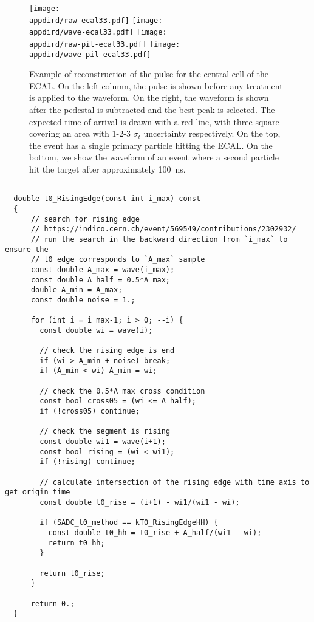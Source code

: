 \begin{figure}[bth!]
  \centering
  \texttt{[image: \\appdird/raw-ecal33.pdf]}
  \texttt{[image: \\appdird/wave-ecal33.pdf]}
  \texttt{[image: \\appdird/raw-pil-ecal33.pdf]}
  \texttt{[image: \\appdird/wave-pil-ecal33.pdf]}    
  \caption[example of pulse reconstruction in NA64]{Example of reconstruction of the pulse for the central cell of the ECAL. On the left column, the pulse is shown before any treatment is applied to the waveform. On the right, the waveform is shown after the pedestal is subtracted and the best peak is selected. The expected time of arrival is drawn with a red line, with three square covering an area with 1-2-3 $\sigma_t$ uncertainty respectively. On the top, the event has a single primary particle hitting the ECAL. On the bottom, we show the waveform of an event where a second particle hit the target after approximately \SI{100}{\nano\second}.}
  \label{fig:pulse-example}
\end{figure}


\begin{lstlisting}

  double t0_RisingEdge(const int i_max) const
  {      
      // search for rising edge
      // https://indico.cern.ch/event/569549/contributions/2302932/
      // run the search in the backward direction from `i_max` to ensure the
      // t0 edge corresponds to `A_max` sample
      const double A_max = wave(i_max);
      const double A_half = 0.5*A_max;
      double A_min = A_max;
      const double noise = 1.;
      
      for (int i = i_max-1; i > 0; --i) {
        const double wi = wave(i);
        
        // check the rising edge is end
        if (wi > A_min + noise) break;
        if (A_min < wi) A_min = wi;
        
        // check the 0.5*A_max cross condition
        const bool cross05 = (wi <= A_half);
        if (!cross05) continue;
        
        // check the segment is rising
        const double wi1 = wave(i+1);
        const bool rising = (wi < wi1);
        if (!rising) continue;
        
        // calculate intersection of the rising edge with time axis to get origin time
        const double t0_rise = (i+1) - wi1/(wi1 - wi);
        
        if (SADC_t0_method == kT0_RisingEdgeHH) {
          const double t0_hh = t0_rise + A_half/(wi1 - wi);
          return t0_hh;
        }
        
        return t0_rise;
      }
      
      return 0.;
  }

\end{lstlisting}


